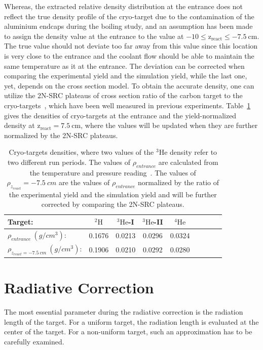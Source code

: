   Whereas, the extracted relative density distribution at the entrance does not reflect the true density profile of the cryo-target due to the contamination of the aluminium endcaps during the boiling study, and an assumption has been made to assign the density value at the entrance to the value at $\mathrm{-10\leq z_{react} \leq -7.5~cm}$. The true value should not deviate too far away from this value since this location is very close to the entrance and the coolant flow should be able to maintain the same temperature as it at the entrance. The deviation can be corrected when comparing the experimental yield and the simulation yield, while the last one, yet, depends on the cross section model. To obtain the accurate density, one can utilize the 2N-SRC plateaus of cross section ratio of the carbon target to the cryo-targets~\cite{SLAC_Measurement_PRC.48.2451,PhysRevLett.96.082501,PhysRevLett.108.092502}, which have been well measured in previous experiments. Table~\ref{cryo_density_table} gives the densities of cryo-targets at the entrance and the yield-normalized density at $\mathrm{z_{react}=7.5~cm}$, where the values will be updated when they are further normalized by the 2N-SRC plateaus.
\begin{table}[htbp]
 \begin{tabular}{lcccccccc}
 \toprule
 Target:                        & $\mathrm{^{2}H}$  & $\mathrm{^{3}He}$-I  & $\mathrm{^{3}He}$-II & $\mathrm{^{4}He}$ \\
 \midrule
 $\rho_{entrance}~(g/cm^{3})$:   & 0.1676   & 0.0213      &  0.0296     & 0.0324 \\
 $\rho_{z_{react}=-7.5~cm}~(g/cm^{3})$:&  0.1906  & 0.0210 &  0.0292    & 0.0280 \\
 \bottomrule
 \end{tabular}
\caption[Cryo-targets densities]{\footnotesize{Cryo-targets densities, where two values of the $\mathrm{^{3}He}$ density refer to two different run periods. The values of $\rho_{entrance}$ are calculated from the temperature and pressure reading~\cite{target_report}. The values of $\rho_{z_{react}}=-7.5~cm$ are the values of $\rho_{entrance}$ normalized by the ratio of the experimental yield and the simulation yield and will be further corrected by comparing the 2N-SRC plateaus.}}
\label{cryo_density_table}
\end{table}

\section{Radiative Correction}
  The most essential parameter during the radiative correction is the radiation length of the target. For a uniform target, the radiation length is evaluated at the center of the target. For a non-uniform target, such an approximation has to be carefully examined. 

